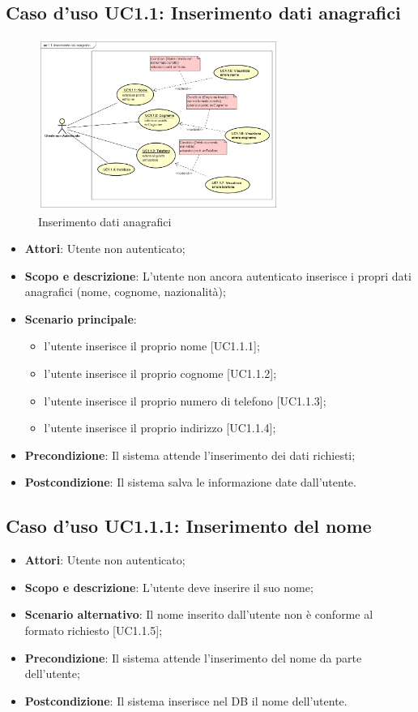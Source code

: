 \documentclass[12pt,a4paper,titlepage]{article}
\begin{document}
	\subsection{Caso d'uso UC1.1: Inserimento dati anagrafici}
	\label{UC1.1}
	\begin{figure}[ht]
		\centering
		\includegraphics[width=0.7\textwidth]{UseCase/InserimentoDatiAnagrafici}
		\caption{Inserimento dati anagrafici}
	\end{figure}
	\begin{itemize}
		\item \textbf{Attori}: Utente non autenticato;
		\item \textbf{Scopo e descrizione}: L'utente non ancora autenticato inserisce i propri dati anagrafici (nome, cognome, nazionalità);
		\item \textbf{Scenario principale}: 
		\begin{itemize}
			\item l'utente inserisce il proprio nome [UC1.1.1];
			\item l'utente inserisce il proprio cognome [UC1.1.2];
			\item l'utente inserisce il proprio numero di telefono [UC1.1.3];
			\item l'utente inserisce il proprio indirizzo [UC1.1.4];
		\end{itemize}
		\item \textbf{Precondizione}: Il sistema attende l'inserimento dei dati richiesti;
		\item \textbf{Postcondizione}: Il sistema salva le informazione date dall'utente.
	\end{itemize}
	\subsection{Caso d'uso UC1.1.1: Inserimento del nome}
	\label{UC1.1.1}
	\begin{itemize}
		\item \textbf{Attori}: Utente non autenticato; 
		\item \textbf{Scopo e descrizione}: L'utente deve inserire il suo nome;
		\item \textbf{Scenario alternativo}: Il nome inserito dall'utente non è conforme al formato richiesto [UC1.1.5];
		\item \textbf{Precondizione}: Il sistema attende l'inserimento del nome da parte dell'utente;
		\item \textbf{Postcondizione}: Il sistema inserisce nel DB il nome dell'utente.
	\end{itemize}
\end{document}

